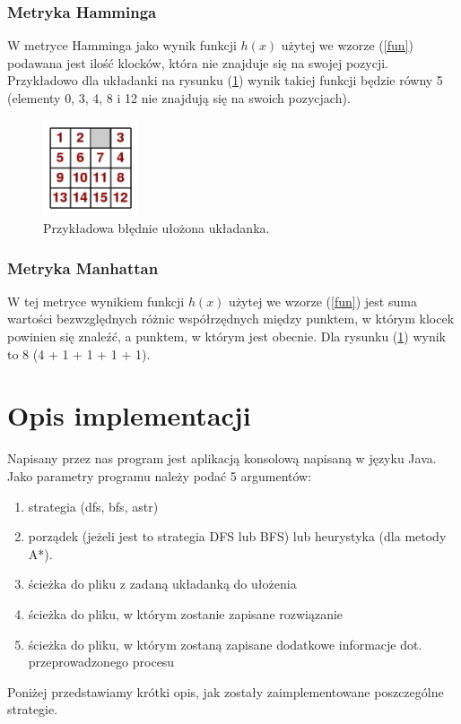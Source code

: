 \documentclass{classrep}
\begin{document}
\subsubsection{Metryka Hamminga} %
W metryce Hamminga jako wynik funkcji $h(x)$ użytej we wzorze (\ref{fun}) podawana jest ilość klocków, która nie znajduje się na swojej pozycji. Przykładowo dla układanki na rysunku (\ref{blednaukladanka}) wynik takiej funkcji będzie równy 5 (elementy 0, 3, 4, 8 i 12 nie znajdują się na swoich pozycjach).
\begin{figure}[h!]
    \centering
    \includegraphics[width=0.25\textwidth]{15wrong1.jpg}
    \caption{Przykładowa błędnie ułożona układanka.}
	\label{blednaukladanka}
\end{figure}

\subsubsection{Metryka Manhattan}  %
W tej metryce wynikiem funkcji $h(x)$ użytej we wzorze (\ref{fun}) jest suma wartości bezwzględnych różnic współrzędnych między punktem, w którym klocek powinien się znaleźć, a punktem, w którym jest obecnie. Dla rysunku (\ref{blednaukladanka}) wynik to 8 (4 + 1 + 1 + 1 + 1).

\section{Opis implementacji} %
Napisany przez nas program jest aplikacją konsolową napisaną w języku Java. Jako parametry programu należy podać 5 argumentów:
\begin{enumerate}
\item strategia (dfs, bfs, astr)
\item porządek (jeżeli jest to strategia DFS lub BFS) lub heurystyka (dla metody A*). 
\item ścieżka do pliku z zadaną układanką do ułożenia
\item ścieżka do pliku, w którym zostanie zapisane rozwiązanie
\item ścieżka do pliku, w którym zostaną zapisane dodatkowe informacje dot. przeprowadzonego procesu
\end{enumerate}
Poniżej przedstawiamy krótki opis, jak zostały zaimplementowane poszczególne strategie.
\end{document}
